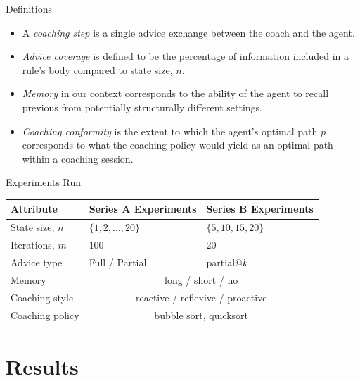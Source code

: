 \documentclass[aspectratio=169]{beamer}
\begin{document}
\begin{frame}{Definitions}
    \begin{itemize}[<+->]
    	\item A \emph{coaching step} is a single advice exchange between the coach and the agent.
        \item \emph{Advice coverage} is defined to be the percentage of information included in a rule's body compared to state size, $n$.
        \item \emph{Memory} in our context corresponds to the ability of the agent to recall previous from potentially structurally different settings.
        \item \emph{Coaching conformity} is the extent to which the agent's optimal path $p$ corresponds to what the coaching policy would yield as an optimal path within a coaching session.
    \end{itemize}
\end{frame}

\begin{frame}{Experiments Run}
    ~\vfill
    \centering
    \begin{tabular}{lll}
        \toprule
        \textbf{Attribute} & \textbf{Series A Experiments} & \textbf{Series B Experiments}\\\midrule
        State size, $n$ & $\{1,2,\ldots,20\}$ & $\{5,10,15,20\}$ \\
        Iterations, $m$ & $100$ & $20$ \\
        Advice type & Full / Partial & partial@$k$ \\
        Memory & \multicolumn{2}{c}{long / short / no} \\
        Coaching style & \multicolumn{2}{c}{reactive / reflexive / proactive} \\
        Coaching policy & \multicolumn{2}{c}{bubble sort, quicksort} \\
        \bottomrule
    \end{tabular}
    \vfill
\end{frame}

\section{Results}
\end{document}
